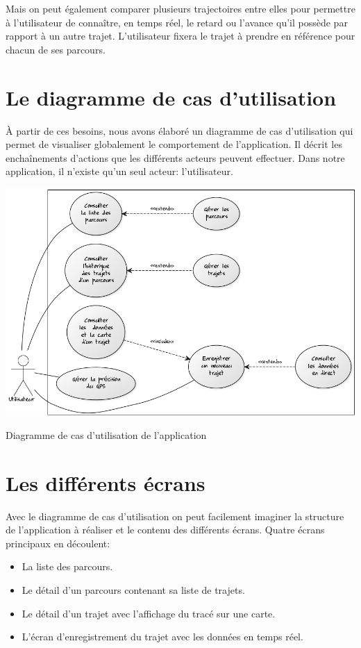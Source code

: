 Mais on peut également comparer plusieurs trajectoires entre elles pour permettre à l'utilisateur de connaître, en temps réel, le retard ou l'avance qu'il possède par rapport à un autre trajet. L'utilisateur fixera le trajet à prendre en référence pour chacun de ses parcours. 

\section{Le diagramme de cas d'utilisation}
À partir de ces besoins, nous avons élaboré un diagramme de cas d'utilisation qui permet de visualiser globalement le comportement de l'application. Il décrit les enchaînements d'actions que les différents acteurs peuvent effectuer. Dans notre application, il n'existe qu'un seul acteur: l'utilisateur.

\begin{img}
  \includegraphics[scale=0.6]{img/DUC2.png}
  \caption{Diagramme de cas d'utilisation de l'application}
\end{img}

\section{Les différents écrans}
Avec le diagramme de cas d'utilisation on peut facilement imaginer la structure de l'application à réaliser et le contenu des différents écrans. Quatre écrans principaux en découlent:\bigskip

\begin{itemize}
  \item La liste des parcours.
  \item Le détail d'un parcours contenant sa liste de trajets.
  \item Le détail d'un trajet avec l'affichage du tracé sur une carte.
  \item L'écran d'enregistrement du trajet avec les données en temps réel.
\end{itemize}\bigskip

